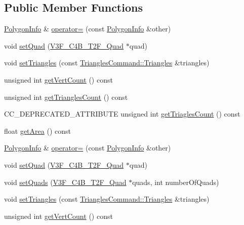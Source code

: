 \subsection*{Public Member Functions}
\begin{DoxyCompactItemize}
\item 
\hyperlink{classPolygonInfo}{Polygon\+Info} \& \hyperlink{group____2d_ga93a62a7d94006f7a4cb05e8471486200}{operator=} (const \hyperlink{classPolygonInfo}{Polygon\+Info} \&other)
\item 
void \hyperlink{group____2d_ga119fbf0478829130e57de44eeddb37ea}{set\+Quad} (\hyperlink{structV3F__C4B__T2F__Quad}{V3\+F\+\_\+\+C4\+B\+\_\+\+T2\+F\+\_\+\+Quad} $\ast$quad)
\item 
void \hyperlink{group____2d_ga0fd028d854bdb30347161b5d816743a4}{set\+Triangles} (const \hyperlink{structTrianglesCommand_1_1Triangles}{Triangles\+Command\+::\+Triangles} \&triangles)
\item 
unsigned int \hyperlink{group____2d_ga266fe3f8a962c0281b381ad1a55835bd}{get\+Vert\+Count} () const
\item 
unsigned int \hyperlink{group____2d_ga0ca8e8c33d34a16c1f8cf33d13aeea2b}{get\+Triangles\+Count} () const
\item 
C\+C\+\_\+\+D\+E\+P\+R\+E\+C\+A\+T\+E\+D\+\_\+\+A\+T\+T\+R\+I\+B\+U\+TE unsigned int \hyperlink{group____2d_ga29950bcfeaeaa13bca256166562caabc}{get\+Triagles\+Count} () const
\item 
float \hyperlink{group____2d_gae6fa5ff93a6637153aa41a755486c21b}{get\+Area} () const
\item 
\hyperlink{classPolygonInfo}{Polygon\+Info} \& \hyperlink{classPolygonInfo_ga93a62a7d94006f7a4cb05e8471486200}{operator=} (const \hyperlink{classPolygonInfo}{Polygon\+Info} \&other)
\item 
void \hyperlink{classPolygonInfo_ga119fbf0478829130e57de44eeddb37ea}{set\+Quad} (\hyperlink{structV3F__C4B__T2F__Quad}{V3\+F\+\_\+\+C4\+B\+\_\+\+T2\+F\+\_\+\+Quad} $\ast$quad)
\item 
void \hyperlink{group____2d_ga6fcf67328cc769e665e5b70b9138d64d}{set\+Quads} (\hyperlink{structV3F__C4B__T2F__Quad}{V3\+F\+\_\+\+C4\+B\+\_\+\+T2\+F\+\_\+\+Quad} $\ast$quads, int number\+Of\+Quads)
\item 
void \hyperlink{classPolygonInfo_ga0fd028d854bdb30347161b5d816743a4}{set\+Triangles} (const \hyperlink{structTrianglesCommand_1_1Triangles}{Triangles\+Command\+::\+Triangles} \&triangles)
\item 
unsigned int \hyperlink{classPolygonInfo_ga266fe3f8a962c0281b381ad1a55835bd}{get\+Vert\+Count} () const

\end{DoxyCompactItemize}
